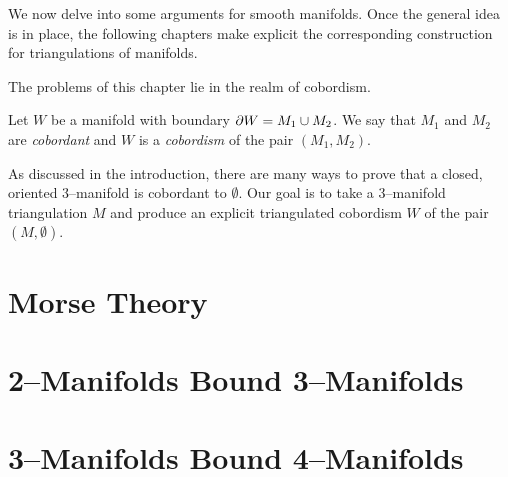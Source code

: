 \label{cha:cobordisms}

We now delve into some arguments for smooth manifolds.
Once the general idea is in place, the following chapters make explicit the corresponding construction for triangulations of manifolds.

The problems of this chapter lie in the realm of cobordism.
\begin{defn}
  \label{def:cobordism}
  Let $W$ be a manifold with boundary $\partial W=M_1\cup M_2$.
  We say that $M_1$ and $M_2$ are \emph{cobordant} and $W$ is a \emph{cobordism} of the pair $(M_1,M_2)$.
\end{defn}
As discussed in the introduction, there are many ways to prove that a closed, oriented 3--manifold is cobordant to $\emptyset$.
Our goal is to take a 3--manifold triangulation $M$ and produce an explicit triangulated cobordism $W$ of the pair $(M,\emptyset)$.

\section{Morse Theory}


\section{2--Manifolds Bound 3--Manifolds}


\section{3--Manifolds Bound 4--Manifolds}


%
